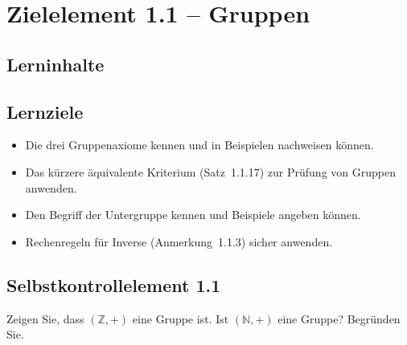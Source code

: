 \documentclass[a4paper,12pt]{article}
\begin{document}
\newpage

\section*{Zielelement 1.1 -- Gruppen}

\subsection*{Lerninhalte}
\begin{center}
\end{center}

\subsection*{Lernziele}
\begin{itemize}
  \item Die drei Gruppenaxiome kennen und in Beispielen nachweisen können.
  \item Das kürzere äquivalente Kriterium (Satz~1.1.17) zur Prüfung von Gruppen anwenden.
  \item Den Begriff der Untergruppe kennen und Beispiele angeben können.
  \item Rechenregeln für Inverse (Anmerkung~1.1.3) sicher anwenden.
\end{itemize}

\subsection*{Selbstkontrollelement 1.1}
Zeigen Sie, dass $(\mathbb{Z}, +)$ eine Gruppe ist. Ist $(\mathbb{N}, +)$ eine Gruppe? Begründen Sie.

\newpage

\end{document}
